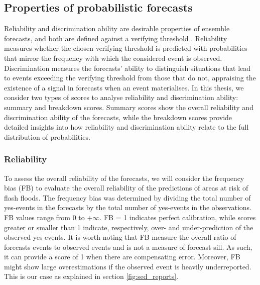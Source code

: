 \subsection{Properties of probabilistic forecasts}

Reliability and discrimination ability are desirable properties of ensemble forecasts, and both are defined against a verifying threshold \citep{Jolliffe_2012, Wilks_2020}. Reliability measures whether the chosen verifying threshold is predicted with probabilities that mirror the frequency with which the considered event is observed. Discrimination measures the forecasts' ability to distinguish situations that lead to events exceeding the verifying threshold from those that do not, appraising the existence of a signal in forecasts when an event materialises. In this thesis, we consider two types of scores to analyse reliability and discrimination ability: summary and breakdown scores. Summary scores show the overall reliability and discrimination ability of the forecasts, while the breakdown scores provide detailed insights into how reliability and discrimination ability relate to the full distribution of probabilities. 


\subsubsection{Reliability}

To assess the overall reliability of the forecasts, we will consider the frequency bias (FB) to evaluate the overall reliability of the predictions of areas at risk of flash floods. The frequency bias was determined by dividing the total number of yes-events in the forecasts by the total number of yes-events in the observations. FB values range from 0 to $+\infty$. FB = 1 indicates perfect calibration, while scores greater or smaller than 1 indicate, respectively, over- and under-prediction of the observed yes-events. It is worth noting that FB measure the overall ratio of forecasts events to observed events and is not a measure of forecast sill. As such, it can provide a score of 1 when there are compensating error. Moreover, FB might show large overestimations if the observed event is heavily underreported. This is our case as explained in section \ref{fig:sed_reports}.

